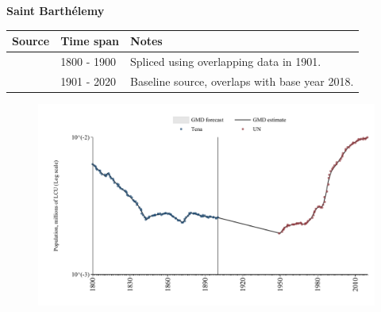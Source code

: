\documentclass[12pt,a4paper,landscape]{article}
\begin{document}
\begin{adjustbox}{max totalsize={\paperwidth}{\paperheight},center}
\begin{minipage}[t][\textheight][t]{\textwidth}
\vspace*{0.5cm}
{}
\begin{center}
{\Large\bfseries Saint Barthélemy}
\end{center}
\vspace{0.5cm}
\begin{table}[H]
\centering
\small
\begin{tabular}{|l|l|l|}
\hline
\textbf{Source} & \textbf{Time span} & \textbf{Notes} \\
\hline
\rowcolor{white}\cite{Tena}& 1800 - 1900 &Spliced using overlapping data in 1901.\\
\rowcolor{lightgray}\cite{UN}& 1901 - 2020 &Baseline source, overlaps with base year 2018.\\
\hline
\end{tabular}
\end{table}
\begin{figure}[H]
\centering
\includegraphics[width=\textwidth,height=0.6\textheight,keepaspectratio]{graphs/BLM_pop.pdf}
\end{figure}
\end{minipage}
\end{adjustbox}
\end{document}
